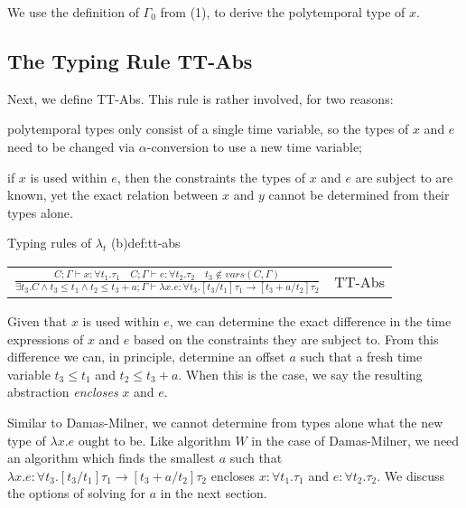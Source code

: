 We use the definition of $\Gamma_0$ from {\scriptsize{(1)}}, to derive the polytemporal type of $x$.
\begin{prooftree}
\end{prooftree}

\subsection{The Typing Rule TT-Abs}
Next, we define TT-Abs.
This rule is rather involved, for two reasons:
\begin{enumerate*}
 \item  polytemporal types only consist of a single time variable, so the types of $x$ and $e$ need to be changed via $\alpha$-conversion to use a new time variable;
 \item  if $x$ is used within $e$, then the constraints the types of $x$ and $e$ are subject to are known, yet the exact relation between $x$ and $y$ cannot be determined from their types alone.
\end{enumerate*}

\begin{definitiontitled}{Typing rules of $\lambda_t$ (b)}{def:tt-abs}
\centering
\begin{tabular}{ r l }
$ \displaystyle 
  \frac{  C; \Gamma \vdash x : \forall t_1.\tau_1 \quad C; \Gamma \vdash e : \forall t_2. \tau_2 \quad t_3 \notin \textit{vars}(C,\Gamma)
  }{      \exists t_3. C \land t_3 \leq t_1 \land t_2 \leq t_3+a;\Gamma \vdash \lambda x. e : \forall t_3. [t_3/t_1]\tau_1 \to [t_3 + a/t_2]\tau_2 }
$
& TT-Abs \\
\end{tabular}
\end{definitiontitled}

Given that $x$ is used within $e$, we can determine the exact difference in the time expressions of $x$ and $e$ based on the constraints they are subject to.
From this difference we can, in principle, determine an offset $a$ such that a fresh time variable $t_3 \leq t_1$ and $t_2 \leq t_3 + a$.
When this is the case, we say the resulting abstraction \textit{encloses} $x$ and $e$.

Similar to Damas-Milner, we cannot determine from types alone what the new type of $\lambda x.e$ ought to be.
Like algorithm $W$ in the case of Damas-Milner, we need an algorithm which finds the smallest $a$ such that $\lambda x. e : \forall t_3.[t_3/t_1]\tau_1 \to [t_3 + a/t_2]\tau_2$ encloses $x : \forall t_1.\tau_1 $ and $e : \forall t_2. \tau_2$. 
We discuss the options of solving for $a$ in the next section.

